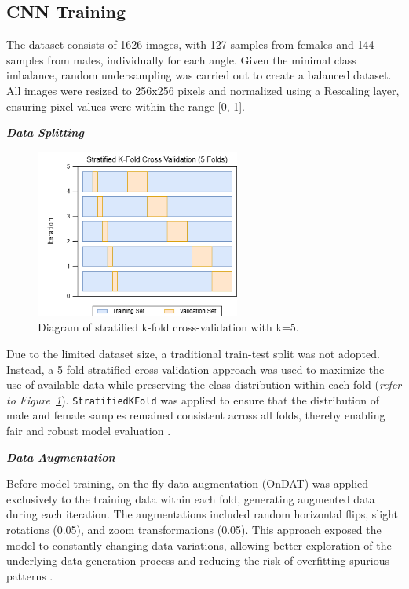 \subsection{CNN Training}
The dataset consists of 1626 images, with 127 samples from females and 144 samples from males, individually for each angle. Given the minimal class imbalance, random undersampling was carried out to create a balanced dataset. All images were resized to 256x256 pixels and normalized using a Rescaling layer, ensuring pixel values were within the range [0, 1].

\textbf{\textit{Data Splitting}}
\begin{figure}[h]
	\centering
	\includegraphics[width=0.6\textwidth]{figures/skf.png}
	\caption{Diagram of stratified k-fold cross-validation with k=5.}
	\label{fig:skfold}
\end{figure}

Due to the limited dataset size, a traditional train-test split was not adopted. Instead, a 5-fold stratified cross-validation approach was used to maximize the use of available data while preserving the class distribution within each fold (\textit{refer to Figure~\ref{fig:skfold}}). \texttt{StratifiedKFold} was applied to ensure that the distribution of male and female samples remained consistent across all folds, thereby enabling fair and robust model evaluation \cite{stratifiedKFold2020}.

\newpage
\textbf{\textit{Data Augmentation}}

Before model training, on-the-fly data augmentation (OnDAT) was applied exclusively to the training data within each fold, generating augmented data during each iteration. The augmentations included random horizontal flips, slight rotations (0.05), and zoom transformations (0.05)\cite{awan2022}. This approach exposed the model to constantly changing data variations, allowing better exploration of the underlying data generation process and reducing the risk of overfitting spurious patterns \cite{cerqueira2024}. 

